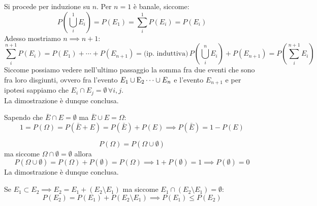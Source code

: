 \documentclass{report}
\begin{document}
	\begin{myproof}
	Si procede per induzione su $n$. Per $n = 1$ è banale, siccome:
	$$
		P \left( \bigcup_i^1 E_i \right) = P(E_1) = \sum_i^1 P(E_i) = P(E_i)
	$$
	Adesso mostriamo $n \implies n+1$:
	$$
		\sum_i^{n+1} P(E_i) = P(E_1) + \cdots + P(E_{n+1}) = \text{(ip. induttiva)} \, P \left(\bigcup_i^n E_i \right) + P(E_{n+1}) = P \left( \sum_{i}^{n+1} E_i \right)
	$$
	Siccome possiamo vedere nell'ultimo passaggio la somma fra due eventi che sono fra loro disgiunti, ovvero fra l'evento $E_1 \cup \operatorname{E}_2 \cdots \cup E_n$ e l'evento $E_{n+1}$ e per ipotesi sappiamo che $E_i \cap E_j = \emptyset \, \forall i,j$. \\
	La dimostrazione è dunque conclusa.
	\end{myproof}
	\begin{myproof}
		Sapendo che $\bar{E} \cap E = \emptyset$ ma $\bar{E} \cup E = \Omega$:
		$$ 1 = P(\Omega) = P(\bar{E} + E) = P(\bar{E}) + P(E) \implies P(\bar{E}) = 1 - P(E)$$
	\end{myproof}
	\begin{myproof}
		$$
			P(\Omega) = P(\Omega \cup \emptyset)
		$$
		ma siccome $\Omega \cap \emptyset = \emptyset$ allora
		$$
			P(\Omega \cup \emptyset) = P(\Omega) + P(\emptyset) = P(\Omega) \implies 1 + P(\emptyset) = 1 \implies P(\emptyset) = 0
		$$
		La dimostrazione è dunque conclusa.
	\end{myproof}
	\begin{myproof}
		Se $E_1 \subset E_2 \implies E_2 = E_1 + (E_2 \setminus E_1)$ ma siccome $E_1 \cap (E_2 \setminus E_1) = \emptyset$:
		$$P(E_2) = P(E_1) + P(E_2 \setminus E_1) \implies P(E_1) \leq P(E_2)$$
	\end{myproof}
\end{document}
